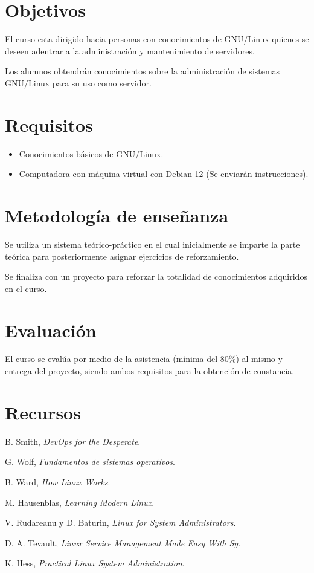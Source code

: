 \documentclass[a4paper,11pt]{article}                 %
\begin{document}
  \section{Objetivos}
    El curso esta dirigido hacia personas con conocimientos de GNU/Linux quienes se deseen adentrar a la administración y mantenimiento de servidores.

    Los alumnos obtendrán conocimientos sobre la administración de sistemas GNU/Linux para su uso como servidor.

  \section{Requisitos}
    \begin{itemize}
      \item Conocimientos básicos de GNU/Linux.
      \item Computadora con máquina virtual con Debian 12 (Se enviarán instrucciones).
    \end{itemize}

  \section{Metodología de enseñanza}
    Se utiliza un sistema teórico-práctico en el cual inicialmente se imparte la parte teórica para posteriormente asignar ejercicios de reforzamiento.

    Se finaliza con un proyecto para reforzar la totalidad de conocimientos adquiridos en el curso.

  \section{Evaluación}
    El curso se evalúa por medio de la asistencia (mínima del 80\%) al mismo y entrega del proyecto, siendo ambos requisitos para la obtención de constancia.

  \section{Recursos}
    \begin{thebibliography}{99}

      B. Smith,
      \textit{DevOps for the Desperate}.

      G. Wolf,
      \textit{Fundamentos de sistemas operativos}.

      B. Ward,
      \textit{How Linux Works}.

      M. Hausenblas,
      \textit{Learning Modern Linux}.

      V. Rudareanu y D. Baturin,
      \textit{Linux for System Administrators}.

      D. A. Tevault,
      \textit{Linux Service Management Made Easy With Sy}.

      K. Hess,
      \textit{Practical Linux System Administration}.

    \end{thebibliography}
\end{document}
